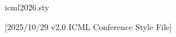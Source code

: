 \begin{filecontents*}[overwrite]{icml2026.sty}
%
%
%
%
%
%
%
%
%
%
%
%


[2025/10/29 v2.0 ICML Conference Style File]


\end{filecontents*}
